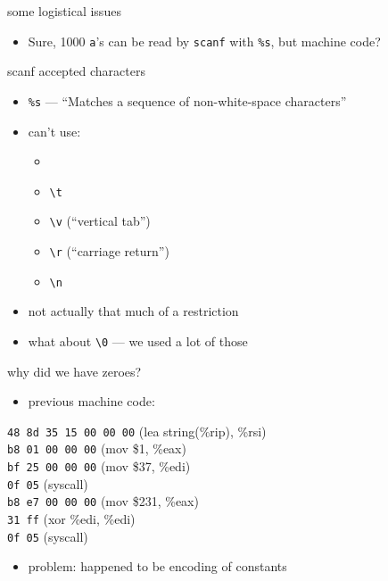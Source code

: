 \usetikzlibrary{positioning}

\begin{frame}{some logistical issues}
    \begin{itemize}
    \item Sure, 1000 {\tt a}'s can be read by {\tt scanf} with {\tt \%s}, but machine code?
    \end{itemize}
\end{frame}

\begin{frame}{scanf accepted characters}
    \begin{itemize}
    \item {\tt \%s} --- ``Matches a sequence of non-white-space characters''
    \item can't use:
        \begin{itemize}
        \item {\tt\textvisiblespace}
        \item {\tt\textbackslash t}
        \item {\tt\textbackslash v} (``vertical tab'')
        \item {\tt\textbackslash r} (``carriage return'')
        \item {\tt\textbackslash n}
        \end{itemize}
    \item not actually that much of a restriction
    \item what about {\tt \textbackslash 0} --- we used a lot of those
    \end{itemize}
\end{frame}

\begin{frame}[fragile,label=virusWhyZeroes]{why did we have zeroes?}
\begin{itemize}
\item previous machine code:
\end{itemize}
{\tt 48 8d 35 {\color{red!70!black}15 00 00 00}}  (lea {\color{red!70!black}string}(\%rip), \%rsi) \\
{\tt b8 {\color{red!70!black}01 00 00 00}} (mov \${\color{red!70!black}1}, \%eax) \\
{\tt bf {\color{red!70!black}25 00 00 00}} (mov \${\color{red!70!black}37}, \%edi) \\
{\tt 0f 05} (syscall) \\
{\tt b8 {\color{red!70!black}e7 00 00 00}} (mov \${\color{red!70!black}231}, \%eax) \\ 
{\tt 31 ff} (xor \%edi, \%edi) \\
{\tt 0f 05} (syscall)
\begin{itemize}
\item problem: happened to be encoding of constants
\end{itemize}
\end{frame}

